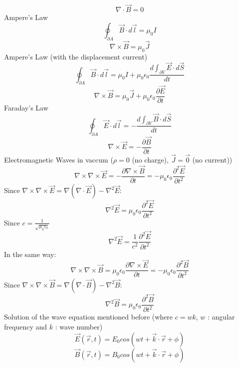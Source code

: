 \documentclass{article}
\begin{document}
\begin{equation}
  \nabla \cdot \vec{B} = 0
\end{equation}
Ampere's Law
\begin{equation}
  \oint_{\partial A} \vec{B} \cdot d\vec{l} = \mu_0I
\end{equation}
\begin{equation}
  \nabla \times \vec{B} = \mu_0 \vec{J}
\end{equation}
Ampere's Law (with the displacement current)
\begin{equation}
  \oint_{\partial A} \vec{B} \cdot d\vec{l} = \mu_0I + \mu_0\epsilon_0\frac{d\int_{\partial V}\vec{E} \cdot d\vec{S}}{dt}
\end{equation}
\begin{equation}
  \nabla \times \vec{B} = \mu_0 \vec{J} + \mu_0\epsilon_0\frac{\partial \vec{E}}{\partial t}
\end{equation}
Faraday's Law
\begin{equation}
 \oint_{\partial A} \vec{E} \cdot d\vec{l} = -\frac{d\int_{\partial V}\vec{B} \cdot d\vec{S}}{dt}  
\end{equation}
\begin{equation}
  \nabla \times \vec{E} = -\frac{\partial \vec{B}}{\partial t}
\end{equation}
Electromagnetic Waves in vaccum ($\rho = 0$ (no charge), $\vec{J} = \vec{0}$ (no current))
\begin{equation}
  \nabla \times \nabla \times \vec{E} = -\frac{\partial \nabla \times \vec{B}}{\partial t} = -\mu_0\epsilon_0\frac{\partial^2\vec{E}}{\partial t^2}
\end{equation}
Since $\nabla \times \nabla \times \vec{E} = \nabla(\nabla \cdot \vec{E}) -\nabla^2 \vec{E}$:
\begin{equation}
  \nabla^2 \vec{E} = \mu_0\epsilon_0\frac{\partial^2\vec{E}}{\partial t^2}
\end{equation}
Since $c = \frac{1}{\sqrt{\mu_0\epsilon_0}}$
\begin{equation}
    \nabla^2 \vec{E} = \frac{1}{c^2}\frac{\partial^2\vec{E}}{\partial t^2}
\end{equation}
In the same way:
\begin{equation}
  \nabla \times \nabla \times \vec{B} = \mu_0\epsilon_0\frac{\partial \nabla \times \vec{E}}{\partial t} = - \mu_0\epsilon_0 \frac{\partial^2 \vec{B}}{\partial t^2}
\end{equation}
Since $\nabla \times \nabla \times \vec{B} = \nabla(\nabla \cdot \vec{B}) -\nabla^2 \vec{B}$:
\begin{equation}
  \nabla^2 \vec{B} = \mu_0\epsilon_0\frac{\partial^2\vec{B}}{\partial t^2}
\end{equation}
Solution of the wave equation mentioned before (where $c=wk$, $w$ : angular frequency and $k$ : wave number)
\begin{equation}
  \vec{E}(\vec{r},t) = E_0cos(wt + \vec{k} \cdot \vec{r} + \phi)
\end{equation}
\begin{equation}
  \vec{B}(\vec{r},t) = B_0cos(wt + \vec{k} \cdot \vec{r} + \phi)
\end{equation}
\end{document}
